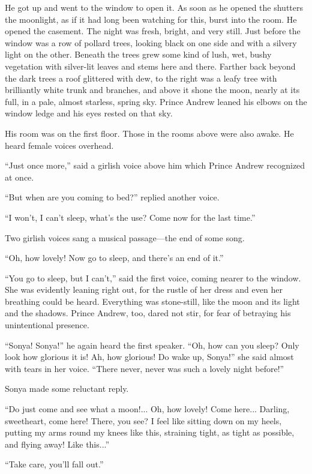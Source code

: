 He got up and went to the window to open it. As soon as he opened
the shutters the moonlight, as if it had long been watching for
this, burst into the room. He opened the casement. The night was
fresh, bright, and very still. Just before the window was a row
of pollard trees, looking black on one side and with a silvery
light on the other. Beneath the trees grew some kind of lush,
wet, bushy vegetation with silver-lit leaves and stems here and
there. Farther back beyond the dark trees a roof glittered with
dew, to the right was a leafy tree with brilliantly white trunk
and branches, and above it shone the moon, nearly at its full, in
a pale, almost starless, spring sky. Prince Andrew leaned his
elbows on the window ledge and his eyes rested on that sky.

His room was on the first floor. Those in the rooms above were
also awake. He heard female voices overhead.

``Just once more,'' said a girlish voice above him which Prince
Andrew recognized at once.

``But when are you coming to bed?'' replied another voice.

``I won't, I can't sleep, what's the use? Come now for the last
time.''

Two girlish voices sang a musical passage---the end of some song.

``Oh, how lovely! Now go to sleep, and there's an end of it.''

``You go to sleep, but I can't,'' said the first voice, coming
nearer to the window. She was evidently leaning right out, for
the rustle of her dress and even her breathing could be
heard. Everything was stone-still, like the moon and its light
and the shadows. Prince Andrew, too, dared not stir, for fear of
betraying his unintentional presence.

``Sonya! Sonya!'' he again heard the first speaker. ``Oh, how can
you sleep? Only look how glorious it is! Ah, how glorious! Do
wake up, Sonya!'' she said almost with tears in her
voice. ``There never, never was such a lovely night before!''

Sonya made some reluctant reply.

``Do just come and see what a moon!... Oh, how lovely! Come
here...  Darling, sweetheart, come here! There, you see? I feel
like sitting down on my heels, putting my arms round my knees
like this, straining tight, as tight as possible, and flying
away! Like this...''

``Take care, you'll fall out.''

